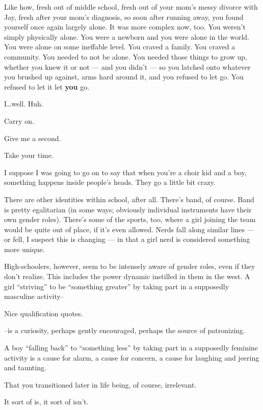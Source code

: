 \begin{paracol}{2}
\begin{leftcolumn}
\begin{ally}
Like how, fresh out of middle school, fresh out of your mom's messy divorce with Jay, fresh after your mom's diagnosis, so soon after running away, you found yourself once again largely alone. It was more complex now, too. You weren't simply physically alone. You were a newborn and you were alone in the world. You were alone on some ineffable level. You craved a family. You craved a community. You needed to not be alone. You needed those things to grow up, whether you knew it or not --- and you didn't --- so you latched onto whatever you brushed up against, arms hard around it, and you refused to let go. You refused to let it let \textbf{you} go.
\end{ally}
I\ldots{}well. Huh.

\begin{ally}
Carry on.
\end{ally}
Give me a second.

\begin{ally}
Take your time.
\end{ally}
I suppose I was going to go on to say that when you're a choir kid and a boy, something happens inside people's heads. They go a little bit crazy.

There are other identities within school, after all. There's band, of course. Band is pretty egalitarian (in some ways; obviously individual instruments have their own gender roles). There's some of the sports, too, where a girl joining the team would be quite out of place, if it's even allowed. Nerds fall along similar lines --- or fell, I suspect this is changing --- in that a girl nerd is considered something more unique.

High-schoolers, however, seem to be intensely aware of gender roles, even if they don't realize. This includes the power dynamic instilled in them in the west. A girl ``striving'' to be ``something greater'' by taking part in a supposedly masculine activity--

\begin{ally}
Nice qualification quotes.
\end{ally}
--is a curiosity, perhaps gently encouraged, perhaps the source of patronizing.

A boy ``falling back'' to ``something less'' by taking part in a supposedly feminine activity is a cause for alarm, a cause for concern, a cause for laughing and jeering and taunting.

\begin{ally}
That you transitioned later in life being, of course, irrelevant.
\end{ally}
It sort of is, it sort of isn't.


\end{leftcolumn}
\end{paracol}
